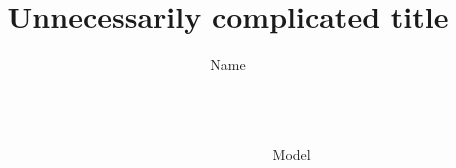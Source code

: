 \documentclass[final]{beamer}
\title{\textbf{Unnecessarily complicated title}}
\author{Name}
\institute{Name of department}
\newlength{\sepwid}
\newlength{\onecolwid}
\newlength{\threecolwid}
\newlength{\onehalf}
\begin{document}
\begin{frame}[t]
\begin{columns}[t]	

\begin{column}{\sepwid}\end{column}	


\begin{column}{\sepwid}\end{column}	

\begin{column}{\threecolwid}		

\begin{columns}[t,totalwidth=2\onehalf]	%

\begin{column}{\onehalf}

\begin{block}{Model}

\lipsum[66]

\lipsum[5]

\end{block}






\end{column}

\begin{column}{\sepwid} \vrule \end{column}	

\begin{column}{\onehalf}


\end{column}
\end{columns}
\end{column}
\end{columns}
\end{frame}
\end{document}
